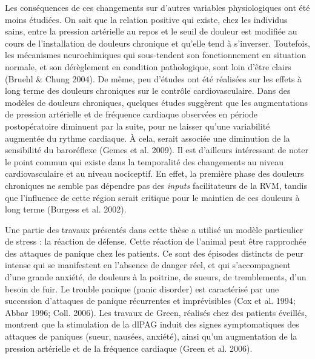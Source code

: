 \documentclass[a4paper,12pt,twoside]{report}
\begin{document}
Les conséquences de ces changements sur d’autres variables physiologiques ont été moins étudiées. On sait que la relation positive qui existe, chez les individus sains, entre la pression artérielle au repos et le seuil de douleur est modifiée au cours de l’installation de douleurs chronique et qu’elle tend à s’inverser. Toutefois, les mécanismes neurochimiques qui sous-tendent son fonctionnement en situation normale, et son dérèglement en condition pathologique, sont loin d’être clairs (Bruehl \& Chung 2004). De même, peu d’études ont été réalisées sur les effets à long terme des douleurs chroniques sur le contrôle cardiovasculaire. Dans des modèles de douleurs chroniques, quelques études suggèrent que les augmentations de pression artérielle et de fréquence cardiaque observées en période postopératoire diminuent par la suite, pour ne laisser qu’une variabilité augmentée du rythme cardiaque. À cela, serait associée une diminution de la sensibilité du baroréflexe (Gemes et al. 2009). Il est d’ailleurs intéressant de noter le point commun qui existe dans la temporalité des changements au niveau cardiovasculaire et au niveau nociceptif. En effet, la première phase des douleurs chroniques ne semble pas dépendre pas des \textit{inputs} facilitateurs de la RVM, tandis que l’influence de cette région serait critique pour le maintien de ces douleurs à long terme (Burgess et al. 2002).

Une partie des travaux présentés dans cette thèse a utilisé un modèle particulier de stress : la réaction de défense. Cette réaction de l’animal peut être rapprochée des attaques de panique chez les patients. Ce sont des épisodes distincts de peur intense qui se manifestent en l’absence de danger réel, et qui s’accompagnent d’une grande anxiété, de douleurs à la poitrine, de sueurs, de tremblements, d’un besoin de fuir. Le trouble panique (panic disorder) est caractérisé par une succession d’attaques de panique récurrentes et imprévisibles (Cox et al. 1994; Abbar 1996; Coll. 2006). Les travaux de Green, réalisés chez des patients éveillés, montrent que la stimulation de la dlPAG induit des signes symptomatiques des attaques de paniques (sueur, nausées, anxiété), ainsi qu’un augmentation de la pression artérielle et de la fréquence cardiaque (Green et al. 2006). 
\end{document}
